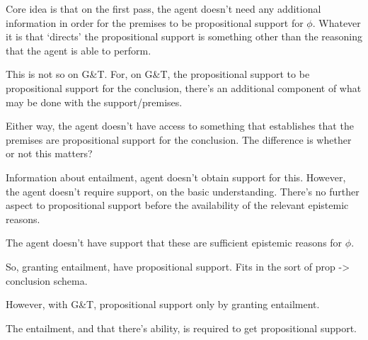 {  \begin{note}
    Core idea is that on the first pass, the agent doesn't need any additional information in order for the premises to be propositional support for \(\phi\).
    Whatever it is that `directs' the propositional support is something other than the reasoning that the agent is able to perform.

    This is not so on G\&T.
    For, on G\&T, the propositional support to be propositional support for the conclusion, there's an additional component of what may be done with the support/premises.

    Either way, the agent doesn't have access to something that establishes that the premises are propositional support for the conclusion.
    The difference is whether or not this matters?

    Information about entailment, agent doesn't obtain support for this.
    However, the agent doesn't require support, on the basic understanding.
    There's no further aspect to propositional support before the availability of the relevant epistemic reasons.

    The agent doesn't have support that these are sufficient epistemic reasons for \(\phi\).

    So, granting entailment, have propositional support.
    Fits in the sort of prop -> conclusion schema.

    However, with G\&T, propositional support only by granting entailment.

    The entailment, and that there's ability, is required to get propositional support.
  \end{note}
}


